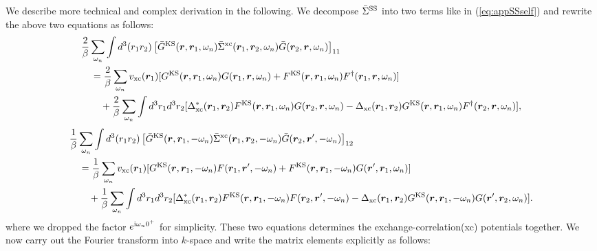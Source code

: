 We describe more technical and complex derivation in the following.
We decompose $\bar{\Sigma}^{\rm SS} $ into two terms like in (\ref{eq:appSSself}) and rewrite the 
above two equations as follows:
%
\begin{equation}
	\begin{split}
	& \frac{2}{\beta} \sum_{\omega_n}
	\int d^3(r_1 r_2) \left[ \bar{G}^{\rm KS}(\bm r, \bm r_1, \omega_n)
	\bar{\Sigma }^{\rm xc}(\bm r_1, \bm r_2, \omega_n) \bar{G}(\bm r_2, \bm r, \omega_n)
	\right]_{11} \\
	&\quad =
	\frac{2}{\beta}\sum_{\omega_n} 
	v_{\rm xc}(\bm r_1) [G^{\rm KS}(\bm r,\bm r_1,\omega_n)G(\bm r_1, \bm r, \omega_n)+
	F^{\rm KS}(\bm r, \bm r_1, \omega_n)F^{\dag}(\bm r_1, \bm r, \omega_n)] \\
	&\quad \quad + 
	\frac{2}{\beta}\sum_{\omega_n}
	\int d^3r_1 d^3r_2 
	[\Delta_{\rm xc}^{\ast}(\bm r_1, \bm r_2)
	F^{\rm KS}(\bm r,\bm r_1, \omega_n)G(\bm r_2, \bm r, \omega_n) 
	- \Delta_{\rm xc}(\bm r_1, \bm r_2)
	G^{\rm KS}(\bm r,\bm r_1, \omega_n)F^{\dag}(\bm r_2, \bm r, \omega_n) 
	],
	\label{eq:11comp1}
\end{split}
\end{equation}
%
\begin{equation}
	\begin{split}
	& \frac{1}{\beta} \sum_{\omega_n}
	\int d^3(r_1 r_2) \left[ \bar{G}^{\rm KS}(\bm r, \bm r_1, -\omega_n)
	\bar{\Sigma }^{\rm xc}(\bm r_1, \bm r_2, -\omega_n) \bar{G}(\bm r_2, \bm r', -\omega_n)
	\right]_{12} \\
	&\quad =
	\frac{1}{\beta}\sum_{\omega_n} 
	v_{\rm xc}(\bm r_1) [G^{\rm KS}(\bm r,\bm r_1,-\omega_n)F(\bm r_1, \bm r', -\omega_n)+
	F^{\rm KS}(\bm r, \bm r_1, -\omega_n)G(\bm r', \bm r_1, \omega_n)] \\
	&\quad \quad + 
	\frac{1}{\beta}\sum_{\omega_n}
	\int d^3r_1 d^3r_2 
	[\Delta_{\rm xc}^{\ast}(\bm r_1, \bm r_2)
	F^{\rm KS}(\bm r,\bm r_1, -\omega_n)F(\bm r_2, \bm r', -\omega_n) 
	- \Delta_{\rm xc}(\bm r_1, \bm r_2)
	G^{\rm KS}(\bm r,\bm r_1, -\omega_n)G(\bm r', \bm r_2, \omega_n) 
	].
	\label{eq:12comp1}
\end{split}
\end{equation}
%
where we dropped the factor $e^{ {\rm i}\omega_n0^{+}}$ for simplicity. 
These two equations determines the exchange-correlation(xc) potentials together.
We now carry out the Fourier transform into $k$-space and write the matrix elements explicitly
as follows:
%
